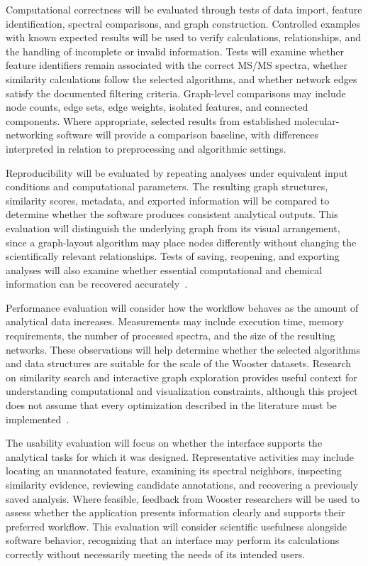         Computational correctness will be evaluated through tests of data import, feature identification, spectral comparisons, and graph construction. Controlled examples with known expected results will be used to verify calculations, relationships, and the handling of incomplete or invalid information. Tests will examine whether feature identifiers remain associated with the correct MS/MS spectra, whether similarity calculations follow the selected algorithms, and whether network edges satisfy the documented filtering criteria. Graph-level comparisons may include node counts, edge sets, edge weights, isolated features, and connected components. Where appropriate, selected results from established molecular-networking software will provide a comparison baseline, with differences interpreted in relation to preprocessing and algorithmic settings.

        Reproducibility will be evaluated by repeating analyses under equivalent input conditions and computational parameters. The resulting graph structures, similarity scores, metadata, and exported information will be compared to determine whether the software produces consistent analytical outputs. This evaluation will distinguish the underlying graph from its visual arrangement, since a graph-layout algorithm may place nodes differently without changing the scientifically relevant relationships. Tests of saving, reopening, and exporting analyses will also examine whether essential computational and chemical information can be recovered accurately~\cite{Wilson2017}.

        Performance evaluation will consider how the workflow behaves as the amount of analytical data increases. Measurements may include execution time, memory requirements, the number of processed spectra, and the size of the resulting networks. These observations will help determine whether the selected algorithms and data structures are suitable for the scale of the Wooster datasets. Research on similarity search and interactive graph exploration provides useful context for understanding computational and visualization constraints, although this project does not assume that every optimization described in the literature must be implemented~\cite{Bayardo2007,Pienta2015}.

        The usability evaluation will focus on whether the interface supports the analytical tasks for which it was designed. Representative activities may include locating an unannotated feature, examining its spectral neighbors, inspecting similarity evidence, reviewing candidate annotations, and recovering a previously saved analysis. Where feasible, feedback from Wooster researchers will be used to assess whether the application presents information clearly and supports their preferred workflow. This evaluation will consider scientific usefulness alongside software behavior, recognizing that an interface may perform its calculations correctly without necessarily meeting the needs of its intended users.

